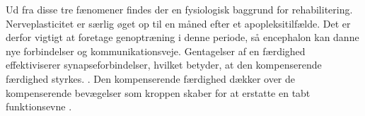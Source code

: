 Ud fra disse tre fænomener findes der en fysiologisk baggrund for rehabilitering. Nerveplasticitet er særlig øget op til en måned efter et apopleksitilfælde. Det er derfor vigtigt at foretage genoptræning i denne periode, så encephalon kan danne nye forbindelser og kommunikationsveje. \cite{Rugnett2015} Gentagelser af en færdighed effektiviserer synapseforbindelser, hvilket betyder, at den kompenserende færdighed styrkes. \cite{Stanfield2014}. Den kompenserende færdighed dækker over de kompenserende bevægelser som kroppen skaber for at erstatte en tabt funktionsevne \cite{Takeuchi2012,Leea2009}. %



